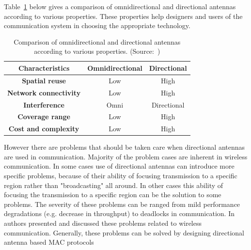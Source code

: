\documentclass[12pt, oneandhalf, chaparabic, sees, ms]{metu}
\begin{document}
Table~\ref{tab:omni-dir} below gives a comparison of omnidirectional and directional antennas according to various properties. These properties help designers and users
of the communication system in choosing the appropriate technology.
\vspace{-0.5cm}
\renewcommand{\arraystretch}{1.1}%
\begin{table}[H]
\begin{center}
\caption{Comparison of omnidirectional and directional antennas according to various properties. (Source:~\protect\cite[p.~307]{corderio2006})}
\label{tab:omni-dir}
\begin{adjustbox}{max width=\textwidth}
\begin{tabular}{| c || c | c |} 
\hline
\rowcolor{lightgray}
\textbf{Characteristics} & \textbf{Omnidirectional} & \textbf{Directional}  \tabularnewline
\hline \hline 
\cellcolor{lightgray} \textbf{Spatial reuse}        & Low  &  High        \tabularnewline \hline
\cellcolor{lightgray} \textbf{Network connectivity} & Low  &  High        \tabularnewline \hline
\cellcolor{lightgray} \textbf{Interference}         & Omni &  Directional \tabularnewline \hline
\cellcolor{lightgray} \textbf{Coverage range}       & Low  &  High        \tabularnewline \hline
\cellcolor{lightgray} \textbf{Cost and complexity}  & Low  &  High        \tabularnewline \hline
\end{tabular}
\end{adjustbox}
\end{center}
\end{table}
\renewcommand{\arraystretch}{1}%
% 
% 
%
However there are problems that should be taken care when directional antennas are used in communication. Majority of the problem cases are inherent in
wireless communication. In some cases use of directional antennas can introduce more specific problems, because of their ability of focusing transmission
to a specific region rather than "broadcasting" all around. In other cases this ability of focusing the transmission to a specific region can be the solution
to some problems. The severity of these problems can be ranged from mild performance degradations (e.g. decrease in throughput) to deadlocks in communication.
In~\cite{kolar2004, winters2006, dai2011} authors presented and discussed these problems related to wireless communication. Generally, these problems can be solved by
designing directional antenna based MAC protocols~\cite{subramanian2007, subramanian2010, wong2015, akbar2015, akbar2015t}
\end{document}
